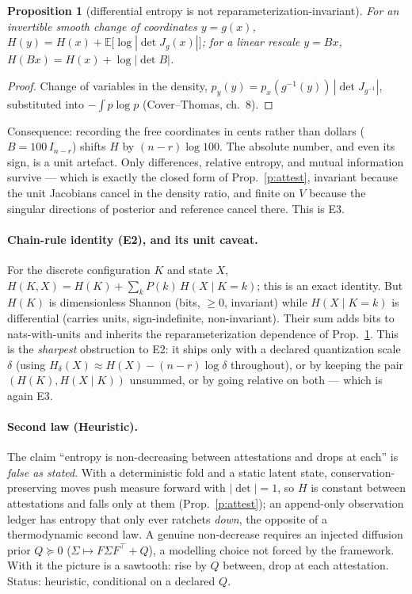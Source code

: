 \documentclass[11pt]{article}
\theoremstyle{definition}\newtheorem{definition}{Definition}
\theoremstyle{plain}\newtheorem{proposition}{Proposition}
\theoremstyle{remark}\newtheorem{remark}{Remark}
\newcommand{\st}{x}                  %
\newcommand{\obs}{y}                 %
\newcommand{\cov}{\Sigma}
\newcommand{\Vsub}{V}                %
\newcommand{\Ent}{H}                 %
\begin{document}
\begin{proposition}[differential entropy is not reparameterization-invariant]\label{p:unit}
For an invertible smooth change of coordinates $\obs=g(\st)$,
$\Ent(\obs)=\Ent(\st)+\mathbb{E}\big[\log|\det J_g(\st)|\big]$; for a linear rescale $\obs=B\st$,
$\Ent(B\st)=\Ent(\st)+\log|\det B|$.
\end{proposition}
\begin{proof}
Change of variables in the density, $p_{\obs}(\obs)=p_{\st}(g^{-1}(\obs))\,|\det J_{g^{-1}}|$,
substituted into $-\int p\log p$ (Cover--Thomas, ch.~8).
\end{proof}
\noindent Consequence: recording the free coordinates in cents rather than dollars
($B=100\,I_{n-r}$) shifts $\Ent$ by $(n-r)\log100$. The absolute number, and even its sign, is a
unit artefact. Only differences, relative entropy, and mutual information survive --- which is
exactly the closed form of Prop.~\ref{p:attest}, invariant because the unit Jacobians cancel in
the density ratio, and finite on $\Vsub$ because the singular directions of posterior and
reference cancel there. This is E3.

\paragraph{Chain-rule identity (E2), and its unit caveat.}
For the discrete configuration $K$ and state $X$,
$\Ent(K,X)=\Ent(K)+\sum_k P(k)\,\Ent(X\mid K=k)$; this is an exact identity. But $\Ent(K)$ is
dimensionless Shannon (bits, $\ge0$, invariant) while $\Ent(X\mid K=k)$ is differential (carries
units, sign-indefinite, non-invariant). Their sum adds bits to nats-with-units and inherits the
reparameterization dependence of Prop.~\ref{p:unit}. This is the \emph{sharpest} obstruction to
E2: it ships only with a declared quantization scale $\delta$ (using
$\Ent_\delta(X)\approx\Ent(X)-(n-r)\log\delta$ throughout), or by keeping the pair
$(\Ent(K),\Ent(X\mid K))$ unsummed, or by going relative on both --- which is again E3.

\paragraph{Second law (Heuristic).}
The claim ``entropy is non-decreasing between attestations and drops at each'' is
\emph{false as stated}. With a deterministic fold and a static latent state, conservation-preserving
moves push measure forward with $|\det|=1$, so $\Ent$ is constant between attestations and falls
only at them (Prop.~\ref{p:attest}); an append-only observation ledger has entropy that only
ever ratchets \emph{down}, the opposite of a thermodynamic second law. A genuine non-decrease
requires an injected diffusion prior $Q\succeq0$ ($\cov\mapsto F\cov F^{\!\top}+Q$), a modelling
choice not forced by the framework. With it the picture is a sawtooth: rise by $Q$ between,
drop at each attestation. Status: heuristic, conditional on a declared $Q$.
\end{document}
